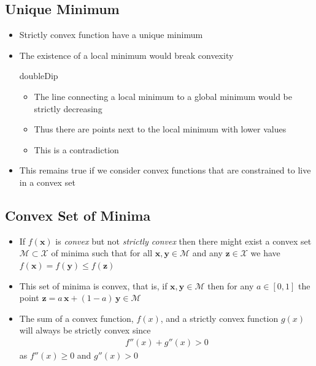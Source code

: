 \begin{slide}
\section[-1]{Unique Minimum}

\begin{PauseHighLight}
  \begin{itemize}
  \item Strictly convex function have a unique minimum\pause
  \item The existence of a local minimum would break convexity\pause

    \begin{rightImage}{doubleDip}
      \begin{itemize}
      \item The line connecting a local minimum to a global minimum
        would be strictly decreasing\pause
      \item Thus there are points next to the local minimum with lower
        values\pause
      \item This is a contradiction\pause
      \end{itemize}
    \end{rightImage}

  \item This remains true if we consider convex functions that are
    constrained to live in a convex set\pause
  \end{itemize}
\end{PauseHighLight}

\end{slide}


\begin{slide}
\section{Convex Set of Minima}

\begin{PauseHighLight}
  \begin{itemize}
  \item If $f(\bm{x})$ is \emph{convex} but not \emph{strictly convex}
    then there might exist a convex set
    $\mathcal{M}\subset\mathcal{X}$ of minima such that for all
    $\bm{x}, \bm{y} \in \mathcal{M}$ and any $\bm{z} \in \mathcal{X}$
    we have $f(\bm{x})=f(\bm{y}) \leq f(\bm{z})$\pause
  \item This set of minima is convex, that is, if $\bm{x}, \bm{y}
    \in \mathcal{M}$ then for any $a\in[0,1]$ the point
    $\bm{z}=a\,\bm{x} + (1-a)\, \bm{y}\in \mathcal{M}$\pause
  \item The sum of a convex function, $f(x)$, and a strictly convex function
    $g(x)$ will always be strictly convex since
    \begin{align*}
      f''(x) + g''(x) >0 
    \end{align*}
    as $f''(x)\geq 0$ and $g''(x)>0$\pause
  \end{itemize}
\end{PauseHighLight}

\end{slide}


